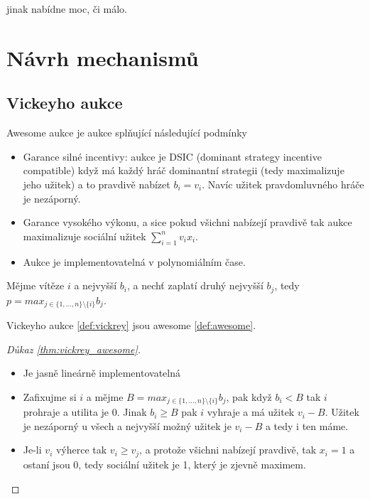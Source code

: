  jinak nabídne moc, či málo.\section{Návrh mechanismů}
\subsection{Vickeyho aukce}
\begin{definition}
\label{def:awesome}
  Awesome aukce je aukce splňující následující podmínky 
  \begin{itemize}
        \item Garance silné incentivy: aukce je DSIC (dominant strategy incentive compatible) když má každý hráč dominantní strategii (tedy maximalizuje jeho užitek) a to pravdivě nabízet $b_i = v_i$. 
        Navíc užitek pravdomluvného hráče je nezáporný.
        \item Garance vysokého výkonu, a sice pokud všichni nabízejí pravdivě tak aukce maximalizuje sociální užitek $\sum^n_{i=1} v_ix_i$. 
        \item Aukce je implementovatelná v polynomiálním čase. 
  \end{itemize}
\end{definition}
\begin{definition}
\label{def:vickrey}
    Mějme vítěze $i$ a nejvyšší $b_i$, a nechť zaplatí druhý nejvyšší $b_j$, tedy $p = max_{j \in \{1,\dots,n\} \setminus \{i\}} b_j$. 
\end{definition}
\begin{theorem}
\label{thm:vickrey_awesome}
    Vickeyho aukce \ref{def:vickrey} jsou awesome \ref{def:awesome}. 
\end{theorem}
\begin{proof}[Důkaz \ref{thm:vickrey_awesome}]
    \begin{itemize} 
        \item Je jasně lineárně implementovatelná 
        \item Zafixujme si $i$ a mějme $B = max_{j \in \{1,\dots,n\} \setminus \{i\}} b_j$, pak když $b_i < B$ tak $i$ prohraje a utilita je $0$. 
            Jinak $b_i \geq B$ pak $i$ vyhraje a má užitek $v_i -B$. 
            Užitek je nezáporný u všech a nejvyšší možný užitek je $v_i -B$ a tedy i ten máme. 
        \item Je-li $v_i$ výherce tak $v_i \geq v_j$, a protože všichni nabízejí pravdivě, tak $x_i = 1$ a ostaní jsou $0$, tedy sociální užitek je 1, který je zjevně maximem. 
    \end{itemize}
\end{proof}
